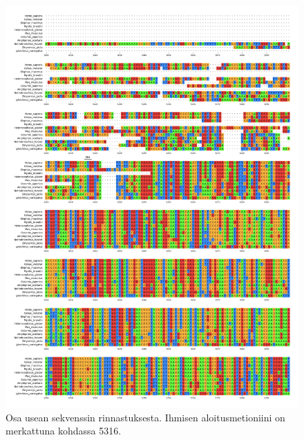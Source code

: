 \documentclass[a4paper,11pt,notitlepage]{article}
\begin{document}
\begin{appendices}
\pagebreak
\begin{figure}[!h]
	\centering
	\includegraphics[width=\textwidth]{msa.png}
	\caption{Osa usean sekvenssin rinnastuksesta. Ihmisen aloitusmetioniini on merkattuna kohdassa 5316.} \label{msa}
\end{figure}

\end{appendices}
\end{document}
